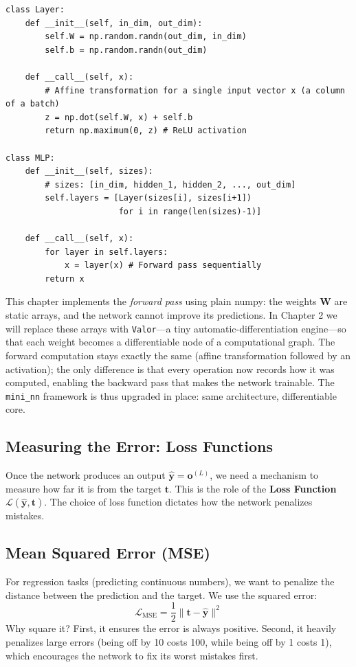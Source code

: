 \documentclass{tufte-handout}
\let\subsubsection\subsection
\begin{document}
\begin{lstlisting}[caption={Implementing the Layer and MLP classes in \texttt{mini\_nn/layers.py}.}]
class Layer:
    def __init__(self, in_dim, out_dim):
        self.W = np.random.randn(out_dim, in_dim)
        self.b = np.random.randn(out_dim)
        
    def __call__(self, x):
        # Affine transformation for a single input vector x (a column of a batch)
        z = np.dot(self.W, x) + self.b
        return np.maximum(0, z) # ReLU activation

class MLP:
    def __init__(self, sizes):
        # sizes: [in_dim, hidden_1, hidden_2, ..., out_dim]
        self.layers = [Layer(sizes[i], sizes[i+1]) 
                       for i in range(len(sizes)-1)]
        
    def __call__(self, x):
        for layer in self.layers:
            x = layer(x) # Forward pass sequentially
        return x
\end{lstlisting}

\begin{remark}
This chapter implements the \emph{forward pass} using plain numpy: the weights $\mathbf{W}$ are static arrays, and the network cannot improve its predictions. In Chapter 2 we will replace these arrays with \texttt{Valor}---a tiny automatic-differentiation engine---so that each weight becomes a differentiable node of a computational graph. The forward computation stays exactly the same (affine transformation followed by an activation); the only difference is that every operation now records how it was computed, enabling the backward pass that makes the network trainable. The \texttt{mini\_nn} framework is thus upgraded in place: same architecture, differentiable core.
\end{remark}
\subsection{Measuring the Error: Loss Functions}

Once the network produces an output $\hat{\mathbf{y}} = \mathbf{o}^{(L)}$, we need a mechanism to measure how far it is from the target $\mathbf{t}$. This is the role of the \textbf{Loss Function} $\mathcal{L}(\hat{\mathbf{y}}, \mathbf{t})$. The choice of loss function dictates how the network penalizes mistakes.

\subsubsection{Mean Squared Error (MSE)}
For regression tasks (predicting continuous numbers), we want to penalize the distance between the prediction and the target. We use the squared error:
\[
\mathcal{L}_{\text{MSE}} = \frac{1}{2}\|\mathbf{t} - \hat{\mathbf{y}}\|^2
\]
Why square it? First, it ensures the error is always positive. Second, it heavily penalizes large errors (being off by 10 costs 100, while being off by 1 costs 1), which encourages the network to fix its worst mistakes first.
\end{document}
